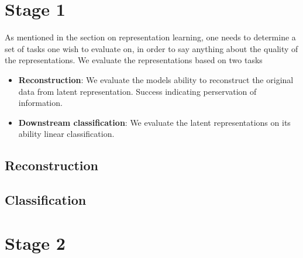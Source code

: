 \documentclass[../../thesis.tex]{subfiles}
\begin{document}
\section{Stage 1}

As mentioned in the section on representation learning, one needs to determine a set of tasks one wish to evaluate on, in order to say anything about the quality of the representations. We evaluate the representations based on two tasks

\begin{itemize}
    \item \textbf{Reconstruction}: We evaluate the models ability to reconstruct the original data from latent representation. Success indicating perservation of information.
    \item \textbf{Downstream classification}: We evaluate the latent representations on its ability  linear classification. 
\end{itemize}

\subsection{Reconstruction}

\subsection{Classification}

\section{Stage 2}
\end{document}
